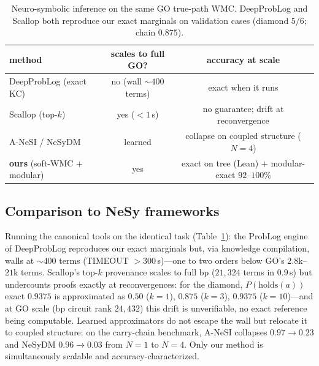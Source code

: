 \documentclass[11pt]{article}
\begin{document}
\begin{table}[t]\centering
\caption{Neuro-symbolic inference on the same GO true-path WMC. DeepProbLog and Scallop both
reproduce our exact marginals on validation cases (diamond $5/6$; chain $0.875$).}\label{tab:nesy}
\small
\begin{tabular}{lcc}
\toprule
method & scales to full GO? & accuracy at scale\\
\midrule
DeepProbLog \citep{manhaeve2018deepproblog} (exact KC) & no (wall ${\sim}400$ terms) & exact when it runs\\
Scallop \citep{huang2021scallop} (top-$k$) & yes (${<}1$\,s) & no guarantee; drift at reconvergence\\
A-NeSI \citep{vankrieken2023anesi} / NeSyDM \citep{vankrieken2025nesydm} & learned & collapse on coupled structure ($N{=}4$)\\
\textbf{ours} (soft-WMC $+$ modular) & yes & exact on tree (Lean) $+$ modular-exact $92$--$100\%$\\
\bottomrule
\end{tabular}
\end{table}

\subsection{Comparison to NeSy frameworks}
Running the canonical tools on the identical task (Table~\ref{tab:nesy}): the ProbLog engine of
DeepProbLog reproduces our exact marginals but, via knowledge compilation, walls at ${\sim}400$
terms (TIMEOUT $>300$\,s)---one to two orders below GO's $2.8$k--$21$k terms. Scallop's top-$k$
provenance scales to full bp ($21{,}324$ terms in $0.9$\,s) but undercounts proofs exactly at
reconvergences: for the diamond, $P(\text{holds}(a))$ exact $0.9375$ is approximated as
$0.50$ ($k{=}1$), $0.875$ ($k{=}3$), $0.9375$ ($k{=}10$)---and at GO scale (bp circuit rank
$24{,}432$) this drift is unverifiable, no exact reference being computable. Learned approximators
do not escape the wall but relocate it to coupled structure: on the carry-chain benchmark, A-NeSI
collapses $0.97\!\to\!0.23$ and NeSyDM $0.96\!\to\!0.03$ from $N{=}1$ to $N{=}4$. Only our method
is simultaneously scalable and accuracy-characterized.
\end{document}
